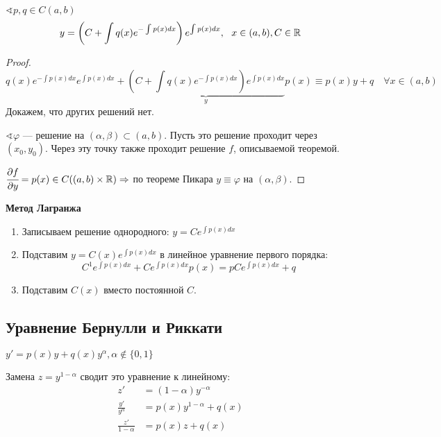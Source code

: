 

\cfoot{}

\setcounter{section}{2}
\setcounter{subsection}{4}



\begin{theorem}
    $\sphericalangle p, q \in C(a, b)$
    $$y = \left( C + \int q(x) e^{-\int p(x)dx} \right)e^{\int p(x)dx}, \ \ x\in(a, b), C\in\mathbb{R}$$
\end{theorem}
\begin{proof}
    $$q(x) e^{-\int p(x)dx} e^{\int p(x)dx} + \underbrace{\left(C + \int q(x) e^{-\int p(x)dx}\right) e^{\int p(x)dx}}_{y} p(x) \equiv p(x) y + q \quad \forall x\in(a, b)$$
    Докажем, что других решений нет.

    $\sphericalangle \varphi$ --- решение на $(\alpha, \beta)\subset(a, b)$. Пусть это решение проходит через $(x_0, y_0)$. Через эту точку также проходит решение $f$, описываемой теоремой.

    $\cfrac{\partial f}{\partial y} = p(x) \in C((a, b)\times \mathbb{R}) \Rightarrow$ по теореме Пикара $y \equiv \varphi$ на $(\alpha, \beta)$.
\end{proof}

\textbf{Метод Лагранжа}
\begin{enumerate}
    \item Записываем решение однородного: $y = Ce^{\int p(x) dx}$
    \item Подставим $y = C(x) e^{\int p(x) dx}$ в линейное уравнение первого порядка:
          $$C^1 e^{\int p(x)dx} + Ce^{\int p(x)dx} p(x) = pCe^{\int p(x)dx} + q$$
    \item Подставим $C(x)$ вместо постоянной $C$.
\end{enumerate}

\subsection{Уравнение Бернулли и Риккати}

\begin{definition}
    $y' = p(x) y + q(x) y^\alpha, \alpha\notin\{0, 1\}$
\end{definition}
Замена $z=y^{1-\alpha}$ сводит это уравнение к линейному:
\begin{align*}
    z'                  & = (1-\alpha)y^{-\alpha}    \\
    \frac{y'}{y^\alpha} & = p(x) y^{1-\alpha} + q(x) \\
    \frac{z'}{1-\alpha} & = p(x) z + q(x)
\end{align*}

